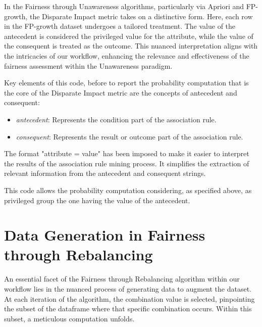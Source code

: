 \documentclass[12pt,a4paper,openright,twoside]{book}
\begin{document}
In the Fairness through Unawareness algorithms, particularly via Apriori and FP-growth, the Disparate Impact metric takes on a distinctive form. Here, each row in the FP-growth dataset undergoes a tailored treatment. The value of the antecedent is considered the privileged value for the attribute, while the value of the consequent is treated as the outcome. This nuanced interpretation aligns with the intricacies of our workflow, enhancing the relevance and effectiveness of the fairness assessment within the Unawareness paradigm.



Key elements of this code, before to report the probability computation that is the core of the Disparate Impact metric are the concepts of antecedent and consequent:

\begin{itemize}

    \item \emph{antecedent}: Represents the condition part of the association rule.
    
    \item \emph{consequent}: Represents the result or outcome part of the association rule.

\end{itemize}

The format "attribute = value" has been imposed to make it easier to interpret the results of the association rule mining process. It simplifies the extraction of relevant information from the antecedent and consequent strings.



This code allows the probability computation considering, as specified above, as privileged group the one having the value of the antecedent.

\section{Data Generation in Fairness through Rebalancing}

An essential facet of the Fairness through Rebalancing algorithm within our workflow lies in the nuanced process of generating data to augment the dataset. At each iteration of the algorithm, the combination value is selected, pinpointing the subset of the dataframe where that specific combination occurs. Within this subset, a meticulous computation unfolds.
\end{document}
